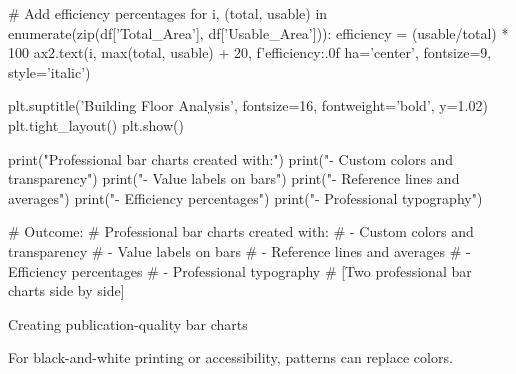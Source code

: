 {    # Add efficiency percentages
    for i, (total, usable) in enumerate(zip(df['Total_Area'], df['Usable_Area'])):
        efficiency = (usable/total) * 100
        ax2.text(i, max(total, usable) + 20, f'{efficiency:.0f}%
                ha='center', fontsize=9, style='italic')
    
    plt.suptitle('Building Floor Analysis', fontsize=16, fontweight='bold', y=1.02)
    plt.tight_layout()
    plt.show()
    
    print("Professional bar charts created with:")
    print("- Custom colors and transparency")
    print("- Value labels on bars")
    print("- Reference lines and averages")
    print("- Efficiency percentages")
    print("- Professional typography")
    
    # Outcome:
    # Professional bar charts created with:
    # - Custom colors and transparency
    # - Value labels on bars
    # - Reference lines and averages
    # - Efficiency percentages
    # - Professional typography
    # [Two professional bar charts side by side]
}{Creating publication-quality bar charts}


For black-and-white printing or accessibility, patterns can replace colors.

